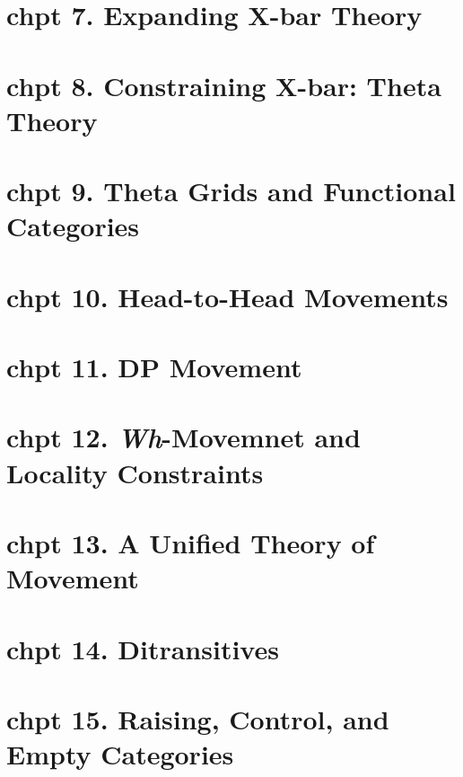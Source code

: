 \documentclass{article}
\begin{document}
\section{chpt 7. Expanding X-bar Theory}

\section{chpt 8. Constraining X-bar: Theta Theory}

\section{chpt 9. Theta Grids and Functional Categories}

\section{chpt 10. Head-to-Head Movements}

\section{chpt 11. DP Movement}

\section{chpt 12. \textit{Wh}-Movemnet and Locality Constraints}

\section{chpt 13. A Unified Theory of Movement}

\section{chpt 14. Ditransitives}

\section{chpt 15. Raising, Control, and Empty Categories}
\end{document}
